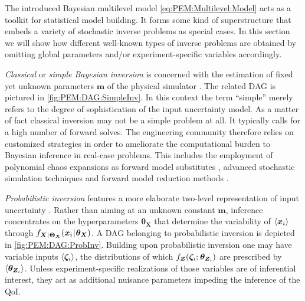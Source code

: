 The introduced Bayesian multilevel model \cref{eq:PEM:Multilevel:Model} acts as a toolkit for statistical model building.
It forms some kind of superstructure that embeds a variety of stochastic inverse problems as special cases.
In this section we will show how different well-known types of inverse problems are obtained by omitting global parameters and/or experiment-specific variables accordingly.
\par %
\textit{Classical} or \textit{simple Bayesian inversion} is concerned with the estimation of fixed yet unknown parameters \(\bm{m}\) of the physical simulator \cite{Inversion:Tarantola2005,Inversion:Kaipio2005}.
The related DAG is pictured in \cref{fig:PEM:DAG:SimpleInv}.
In this context the term ``simple'' merely refers to the degree of sophistication of the input uncertainty model.
As a matter of fact classical inversion may not be a simple problem at all.
It typically calls for a high number of forward solves.
The engineering community therefore relies on customized strategies in order to ameliorate the computational burden to Bayesian inference in real-case problems.
This includes the employment of polynomial chaos expansions as forward model substitutes \cite{PCE:Marzouk2007,PCE:Marzouk2009:a,PCE:Tagade2014},
advanced stochastic simulation techniques \cite{MCMC:Beck2002,MCMC:Ching2007} and forward model reduction methods \cite{Bayesian:Papadimitriou2013,Bayesian:Jensen2014}.
\par %
\textit{Probabilistic inversion} features a more elaborate two-level representation of input uncertainty \cite{Nagel:IPW2013:Proc,Multilevel:Ballesteros2014:Proc}.
Rather than aiming at an unknown constant \(\bm{m}\), inference concentrates on the hyperparameters \(\bm{\theta}_{\bm{X}}\)
that determine the variability of \(\langle{\bm{x}_i}\rangle\) through \(f_{\bm{X} {\:\!}|{\:\!} \bm{\Theta}_{\bm{X}}} (\bm{x}_i {\:\!}|{\:\!} \bm{\theta}_{\bm{X}})\).
A DAG belonging to probabilistic inversion is depicted in \cref{fig:PEM:DAG:ProbInv}.
Building upon probabilistic inversion one may have variable inputs \(\langle{\bm{\zeta}_i}\rangle\),
the distributions of which \(f_{\bm{Z}}(\bm{\zeta}_i ;{\:\!} \bm{\theta}_{\bm{Z}_i})\) are prescribed by \(\langle{\bm{\theta}_{\bm{Z}_i}}\rangle\).
Unless experiment-specific realizations of those variables are of inferential interest, they act as additional nuisance parameters impeding the inference of the QoI.
